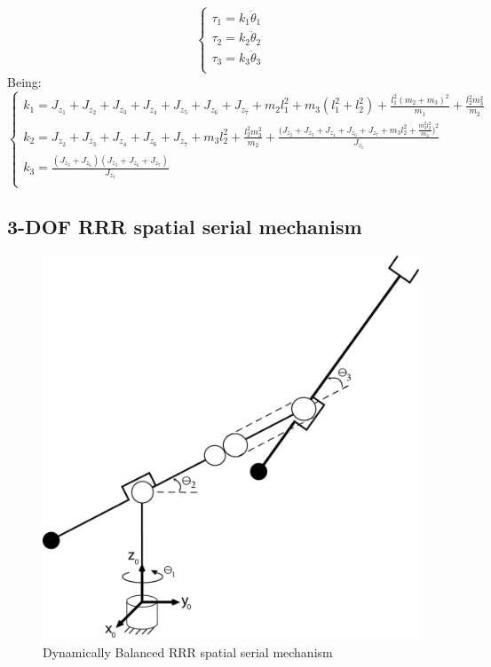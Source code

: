 \documentclass[a4paper,11pt,brazil,fleqn]{article}
\begin{document}
\begin{equation}\label{eq:DynamicBalanced1}
\begin{cases}
\tau_1 = k_1 \ddot{\theta}_1 \\
\tau_2 = k_2 \ddot{\theta}_2 \\
\tau_3 = k_3 \ddot{\theta}_3 \\
\end{cases}
\end{equation}
Being:
\begin{equation}\label{eq:DynamicBalancedKs1}
\begin{cases}
k_1 = J_{z_1} + J_{z_2} + J_{z_3} + J_{z_4} + J_{z_5} + J_{z_6} + J_{z_7} + m_2 l_1^2 + m_3 (l_1^2 + l_2^2) + \frac{l_1^2 (m_2 + m_3)^2}{m_1} + \frac{l_2^2 m_3^2}{m_2} \\
k_2 = J_{z_2} + J_{z_3} + J_{z_4} + J_{z_6} + J_{z_7} + m_3 l_2^2 + \frac{l_2^2 m_3^2}{m_2} + \frac{\big(J_{z_2} + J_{z_3} + J_{z_4} + J_{z_6} + J_{z_7} + m_3 l_2^2 + \frac{m_3^2 l_2^2}{m_2}\big)^2}{J_{z_5}} \\
k_3 = \frac{(J_{z_3}+J_{z_6})(J_{z_3}+J_{z_6}+J_{z_7})}{J_{z_7}} \\
\end{cases}
\end{equation}

\subsection{3-DOF RRR spatial serial mechanism} \label{S03-2}

\begin{figure}[H]
	\centering
	\includegraphics[scale=0.11]{RRR3D.jpg}  
	\caption{Dynamically Balanced RRR spatial serial mechanism}
	\label{fig:RRR3D}
\end{figure}
\end{document}
